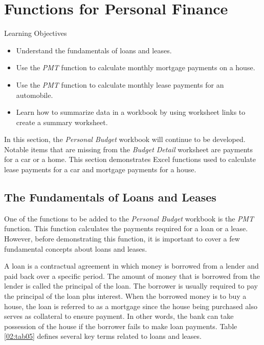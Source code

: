 \section{Functions for Personal Finance}\label{ch02:functions_personal}

\begin{center}
	\begin{objbox}{Learning Objectives}
		\begin{itemize}
			\setlength{\itemsep}{0pt}
			\setlength{\parskip}{0pt}
			\setlength{\parsep}{0pt}
			
			\item Understand the fundamentals of loans and leases.
			\item Use the \textit{PMT} function to calculate monthly mortgage payments on a house.
			\item Use the \textit{PMT} function to calculate monthly lease payments for an automobile.
			\item Learn how to summarize data in a workbook by using worksheet links to create a summary worksheet.

		\end{itemize}
	\end{objbox}
\end{center}

In this section, the \textit{Personal Budget} workbook will continue to be developed. Notable items that are missing from the \textit{Budget Detail} worksheet are payments for a car or a home. This section demonstrates Excel functions used to calculate lease payments for a car and mortgage payments for a house.

\subsection{The Fundamentals of Loans and Leases}

One of the functions to be added to the \textit{Personal Budget} workbook is the \textit{PMT} function. This function calculates the payments required for a loan or a lease. However, before demonstrating this function, it is important to cover a few fundamental concepts about loans and leases.

A loan is a contractual agreement in which money is borrowed from a lender and paid back over a specific period. The amount of money that is borrowed from the lender is called the principal of the loan. The borrower is usually required to pay the principal of the loan plus interest. When the borrowed money is to buy a house, the loan is referred to as a mortgage since the house being purchased also serves as collateral to ensure payment. In other words, the bank can take possession of the house if the borrower fails to make loan payments. Table \ref{02:tab05} defines several key terms related to loans and leases.


